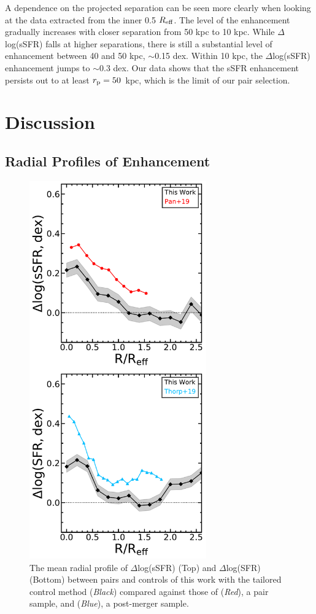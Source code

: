 \documentclass[apj,twocolumn]{emulateapj}
\newcommand{\reff}{$R_{\rm eff}$}
\begin{document}
\begin{CJK*}{UTF8}{gbsn}
A dependence on the projected separation can be seen more clearly when looking at the data extracted from the inner 0.5 \reff. The level of the enhancement gradually increases with closer separation from 50 kpc to 10 kpc. While $\Delta$log(sSFR) falls at higher separations, there is still a substantial level of enhancement between 40 and 50 kpc, $\sim$0.15 dex. Within 10 kpc, the $\Delta$log(sSFR) enhancement jumps to $\sim$0.3 dex. Our data shows that the sSFR enhancement persists out to at least $r_{\rm p} = 50$~kpc, which is the limit of our pair selection. 



\section{Discussion}\label{sec:disc}

\subsection{Radial Profiles of Enhancement}

\begin{figure}
\centering
\includegraphics[width=3in]{prof_comp.pdf}
\caption[]{The mean radial profile of $\Delta$log(sSFR) (Top) and $\Delta$log(SFR) (Bottom) between pairs and controls of this work with the tailored control method ({\it Black}) compared against those of \citet{Pan:2019} ({\it Red}), a pair sample, and \citet{Thorp:2019} ({\it Blue}), a post-merger sample.}
\label{fig:prof_comp}
\end{figure}


\end{CJK*}
\end{document}
